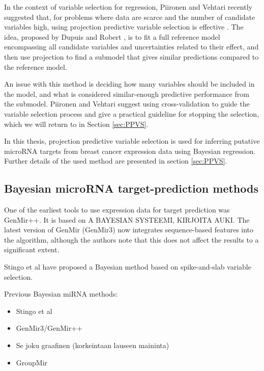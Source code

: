 In the context of variable selection for regression,
Piironen and Vehtari recently suggested that, for problems where data
are scarce and the number of candidate variables high, using projection predictive
variable selection is effective \citep{Piironen2016}. The idea, proposed by
Dupuis and Robert \citep{Dupuis2003}, is to fit a full reference model
encompassing all candidate variables and uncertainties related to their
effect, and then use projection to find a submodel that gives similar
predictions compared to the reference model.

An issue with this method is deciding how many variables should be included
in the model, and what is considered similar-enough predictive performance
from the submodel. Piironen and Vehtari suggest using cross-validation
to guide the variable selection process and give a practical guideline
for stopping the selection, which we will return to in Section \ref{sec:PPVS}.

In this thesis, projection predictive variable selection is used for
inferring putative microRNA targets from breast cancer expression
data using Bayesian regression. Further details of the used method are
presented in section \ref{sec:PPVS}.


\subsection{Bayesian microRNA target-prediction methods}


One of the earliest tools to use expression data for target prediction was
GenMir++. It is based on A BAYESIAN SYSTEEMI, KIRJOITA AUKI.
The latest version of GenMir (GenMir3) now integrates sequence-based features
into the algorithm, although the authors note that this does not affect the
results to a significant extent.

Stingo et al have proposed a Bayesian method based on spike-and-slab variable
selection.

Previous Bayesian miRNA methods:
\begin{itemize}
  \item Stingo et al
  \item GenMir3/GenMir++
  \item Se joku graafinen (korkeintaan lauseen maininta)
  \item GroupMir
\end{itemize}

